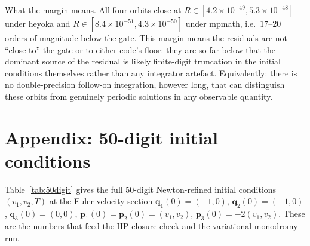\documentclass[10pt]{article}
\newcommand{\qvec}{\mathbf{q}}
\newcommand{\pvec}{\mathbf{p}}
\begin{document}
What the margin means. All four orbits close at
$R \in [4.2\times 10^{-49}, 5.3\times 10^{-48}]$ under heyoka and
$R \in [8.4\times 10^{-51}, 4.3\times 10^{-50}]$ under mpmath,
i.e.\ $17$--$20$ orders of magnitude below the gate. This margin
means the residuals are not ``close to'' the gate or to either code's
floor: they are so far below that the dominant source of the residual
is likely finite-digit truncation in the initial conditions
themselves rather than any integrator artefact. Equivalently: there
is no double-precision follow-on integration, however long, that can
distinguish these orbits from genuinely periodic solutions in any
observable quantity.

\section*{Appendix: 50-digit initial conditions}

Table~\ref{tab:50digit} gives the full $50$-digit Newton-refined
initial conditions $(v_1, v_2, T)$ at the Euler velocity section
$\qvec_1(0) = (-1,0)$, $\qvec_2(0) = (+1,0)$, $\qvec_3(0) = (0,0)$,
$\pvec_1(0) = \pvec_2(0) = (v_1, v_2)$, $\pvec_3(0) = -2(v_1, v_2)$.
These are the numbers that feed the HP closure check and the
variational monodromy run.
\end{document}
